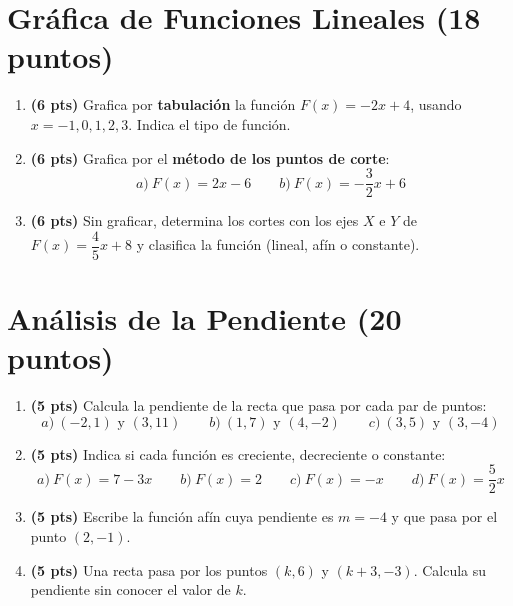\documentclass[12pt, letterpaper]{article}
\begin{document}
\newpage

\section{Gráfica de Funciones Lineales (18 puntos)}

\begin{enumerate}[leftmargin=*]
  \item \textbf{(6 pts)} Grafica por \textbf{tabulación} la función $F(x) = -2x + 4$, usando $x = -1, 0, 1, 2, 3$. Indica el tipo de función.

  \item \textbf{(6 pts)} Grafica por el \textbf{método de los puntos de corte}:
        \[
          a)\ F(x) = 2x - 6 \qquad b)\ F(x) = -\frac{3}{2}x + 6
        \]

  \item \textbf{(6 pts)} Sin graficar, determina los cortes con los ejes $X$ e $Y$ de $F(x) = \dfrac{4}{5}x + 8$ y clasifica la función (lineal, afín o constante).
\end{enumerate}

\newpage

\section{Análisis de la Pendiente (20 puntos)}

\begin{enumerate}[leftmargin=*]
  \item \textbf{(5 pts)} Calcula la pendiente de la recta que pasa por cada par de puntos:
        \[
          a)\ (-2,1) \text{ y } (3,11) \qquad b)\ (1,7) \text{ y } (4,-2) \qquad c)\ (3,5) \text{ y } (3,-4)
        \]

  \item \textbf{(5 pts)} Indica si cada función es creciente, decreciente o constante:
        \[
          a)\ F(x) = 7 - 3x \qquad b)\ F(x) = 2 \qquad c)\ F(x) = -x \qquad d)\ F(x) = \frac{5}{2}x
        \]

  \item \textbf{(5 pts)} Escribe la función afín cuya pendiente es $m = -4$ y que pasa por el punto $(2,-1)$.

  \item \textbf{(5 pts)} Una recta pasa por los puntos $(k, 6)$ y $(k+3, -3)$. Calcula su pendiente sin conocer el valor de $k$.
\end{enumerate}
\end{document}
